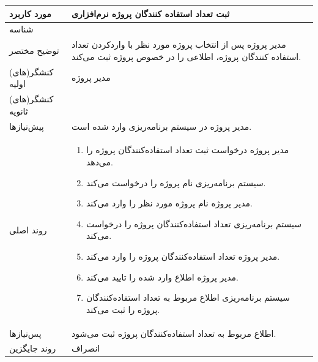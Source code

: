 \begin{table}[H]
	\centering
	\begin{tabular}{|p{3cm}|p{10cm}|}
		\hline
		
		
		مورد کاربرد	& ثبت تعداد استفاده کنندگان پروژه نرم‌افزاری  \\
		\hline
		
		شناسه & 
		\stepcounter{usecase_ID}
		
		\arabic{usecase_ID} \\
		
		\hline
		
		توضیح مختصر & مدیر پروژه پس از انتخاب پروژه مورد نظر با واردکردن تعداد استفاده کنندگان پروژه، اطلاعی را در خصوص پروژه ثبت می‌کند. \\
		\hline
		
		کنشگر(های) اولیه& مدیر پروژه \\
		\hline
		
		کنشگر(های) ثانویه&  \\
		\hline
		
		پیش‌نیازها
		& مدیر پروژه در سیستم برنامه‌ریزی وارد شده است.\\		
		\hline
		
		
		روند اصلی &
		\begin{enumerate}[topsep=0cm,leftmargin=0.5cm]
			\item مدیر پروژه درخواست ثبت تعداد استفاده‌کنندگان پروژه را می‌دهد.
			\item سیستم برنامه‌ریزی نام پروژه را درخواست می‌کند.
			\item مدیر پروژه نام پروژه مورد نظر را وارد می‌کند.
			\item سیستم برنامه‌ریزی تعداد استفاده‌کنندگان پروژه را درخواست می‌کند.
			\item مدیر پروژه تعداد استفاده‌کنندگان پروژه را وارد می‌کند.
			\item مدیر پروژه اطلاع وارد شده را تایید می‌کند.
			\item سیستم برنامه‌ریزی اطلاع مربوط به تعداد استفاده‌کنندگان پروژه را ثبت می‌کند.
		\end{enumerate}\\
		
		\hline
		
		پس‌نیازها &
		اطلاع مربوط به تعداد استفاده‌کنندگان پروژه ثبت می‌شود. \\
		\hline
		
		روند جایگزین
		& انصراف \\
		\hline
		
	\end{tabular}
\end{table}



